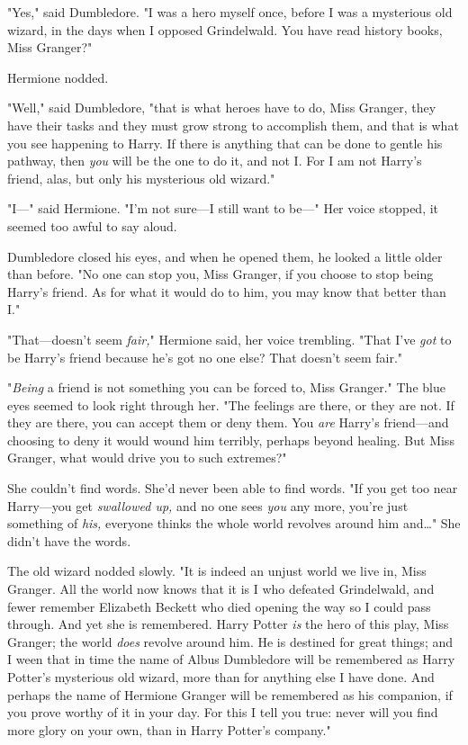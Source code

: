 "Yes," said Dumbledore. "I was a hero myself once, before I was a mysterious
old wizard, in the days when I opposed Grindelwald. You have read history
books, Miss Granger?"

Hermione nodded.

"Well," said Dumbledore, "that is what heroes have to do, Miss Granger, they
have their tasks and they must grow strong to accomplish them, and that is what
you see happening to Harry. If there is anything that can be done to gentle his
pathway, then \emph{you} will be the one to do it, and not I\@. For I am not
Harry's friend, alas, but only his mysterious old wizard."

"I---" said Hermione. "I'm not sure---I still want to be---" Her voice stopped,
it seemed too awful to say aloud.

Dumbledore closed his eyes, and when he opened them, he looked a little older
than before. "No one can stop you, Miss Granger, if you choose to stop being
Harry's friend. As for what it would do to him, you may know that better than
I."

"That---doesn't seem \emph{fair,}" Hermione said, her voice trembling. "That
I've \emph{got} to be Harry's friend because he's got no one else? That doesn't
seem fair."

"\emph{Being} a friend is not something you can be forced to, Miss Granger."
The blue eyes seemed to look right through her. "The feelings are there, or
they are not. If they are there, you can accept them or deny them. You
\emph{are} Harry's friend---and choosing to deny it would wound him terribly,
perhaps beyond healing. But Miss Granger, what would drive you to such
extremes?"

She couldn't find words. She'd never been able to find words. "If you get too
near Harry---you get \emph{swallowed up,} and no one sees \emph{you} any more,
you're just something of \emph{his,} everyone thinks the whole world revolves
around him and{\ldots}" She didn't have the words.

The old wizard nodded slowly. "It is indeed an unjust world we live in, Miss
Granger. All the world now knows that it is I who defeated Grindelwald, and
fewer remember Elizabeth Beckett who died opening the way so I could pass
through. And yet she is remembered. Harry Potter \emph{is} the hero of this
play, Miss Granger; the world \emph{does} revolve around him. He is destined
for great things; and I ween that in time the name of Albus Dumbledore will be
remembered as Harry Potter's mysterious old wizard, more than for anything else
I have done. And perhaps the name of Hermione Granger will be remembered as his
companion, if you prove worthy of it in your day. For this I tell you true:
never will you find more glory on your own, than in Harry Potter's company."

